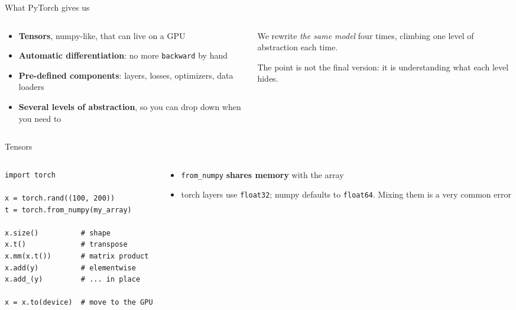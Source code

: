 \documentclass[aspectratio=169,10pt]{beamer}
\begin{document}
\begin{frame}{What PyTorch gives us}
\begin{columns}[T]
\begin{column}{.55\textwidth}
\begin{itemize}
  \item \textbf{Tensors}, numpy-like, that can live on a GPU
  \item \textbf{Automatic differentiation}: no more \texttt{backward} by hand
  \item \textbf{Pre-defined components}: layers, losses, optimizers, data loaders
  \item \textbf{Several levels of abstraction}, so you can drop down when you need to
\end{itemize}
\end{column}
\begin{column}{.42\textwidth}
\begin{keybox}
\small
We rewrite \emph{the same model} four times, climbing one level of abstraction each time.

The point is not the final version: it is understanding what each level hides.
\end{keybox}
\end{column}
\end{columns}
\end{frame}

\begin{frame}[fragile]{Tensors}
\begin{columns}[T]
\begin{column}{.52\textwidth}
\begin{lstlisting}
import torch

x = torch.rand((100, 200))
t = torch.from_numpy(my_array)

x.size()          # shape
x.t()             # transpose
x.mm(x.t())       # matrix product
x.add(y)          # elementwise
x.add_(y)         # ... in place

x = x.to(device)  # move to the GPU
\end{lstlisting}
\end{column}
\begin{column}{.45\textwidth}
\begin{warnbox}
\small
\begin{itemize}
  \item \texttt{from\_numpy} \textbf{shares memory} with the array
  \item torch layers use \texttt{float32}; numpy defaults to \texttt{float64}.
        Mixing them is a very common error
\end{itemize}
\end{warnbox}
\end{column}
\end{columns}
\end{frame}
\end{document}
